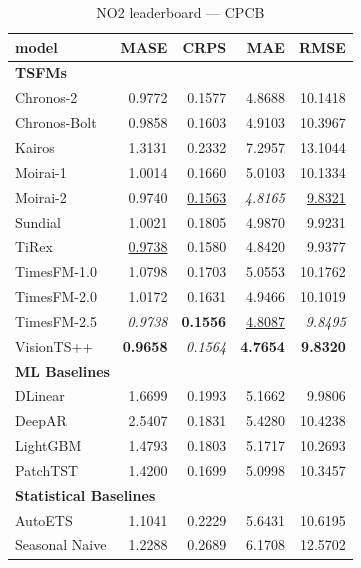 \begin{table}[H]
\caption{NO2 leaderboard --- CPCB}
\centering
\begin{small}
\begin{tabular}{lrrrr}
\toprule
model & MASE & CRPS & MAE & RMSE \\
\midrule
\multicolumn{5}{l}{\textbf{TSFMs}} \\
Chronos-2 & 0.9772 & 0.1577 & 4.8688 & 10.1418 \\
Chronos-Bolt & 0.9858 & 0.1603 & 4.9103 & 10.3967 \\
Kairos & 1.3131 & 0.2332 & 7.2957 & 13.1044 \\
Moirai-1 & 1.0014 & 0.1660 & 5.0103 & 10.1334 \\
Moirai-2 & 0.9740 & \underline{0.1563} & \textit{4.8165} & \underline{9.8321} \\
Sundial & 1.0021 & 0.1805 & 4.9870 & 9.9231 \\
TiRex & \underline{0.9738} & 0.1580 & 4.8420 & 9.9377 \\
TimesFM-1.0 & 1.0798 & 0.1703 & 5.0553 & 10.1762 \\
TimesFM-2.0 & 1.0172 & 0.1631 & 4.9466 & 10.1019 \\
TimesFM-2.5 & \textit{0.9738} & \textbf{0.1556} & \underline{4.8087} & \textit{9.8495} \\
VisionTS++ & \textbf{0.9658} & \textit{0.1564} & \textbf{4.7654} & \textbf{9.8320} \\
\midrule
\multicolumn{5}{l}{\textbf{ML Baselines}} \\
DLinear & 1.6699 & 0.1993 & 5.1662 & 9.9806 \\
DeepAR & 2.5407 & 0.1831 & 5.4280 & 10.4238 \\
LightGBM & 1.4793 & 0.1803 & 5.1717 & 10.2693 \\
PatchTST & 1.4200 & 0.1699 & 5.0998 & 10.3457 \\
\midrule
\multicolumn{5}{l}{\textbf{Statistical Baselines}} \\
AutoETS & 1.1041 & 0.2229 & 5.6431 & 10.6195 \\
Seasonal Naive & 1.2288 & 0.2689 & 6.1708 & 12.5702 \\
\bottomrule
\end{tabular}
\end{small}
\end{table}